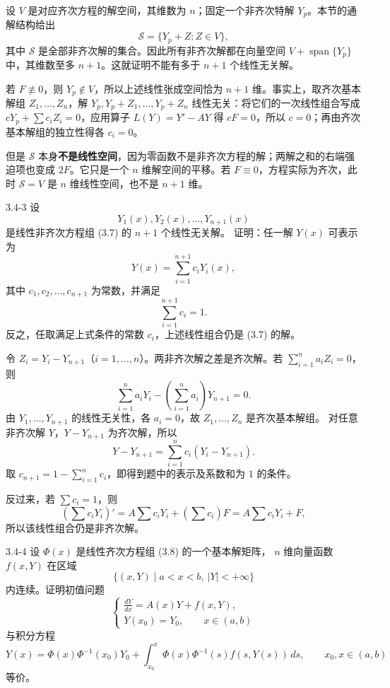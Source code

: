 \documentclass[UTF8,a4paper,11pt]{ctexart}
\begin{document}
\begin{solution}
设 $V$ 是对应齐次方程的解空间，其维数为 $n$；固定一个非齐次特解 $Y_p$。本节的通解结构给出
\[
\mathcal S=\{Y_p+Z:Z\in V\},
\]
其中 $\mathcal S$ 是全部非齐次解的集合。因此所有非齐次解都在向量空间 $V+\operatorname{span}\{Y_p\}$ 中，其维数至多 $n+1$。这就证明不能有多于 $n+1$ 个线性无关解。

若 $F\not\equiv0$，则 $Y_p\notin V$，所以上述线性张成空间恰为 $n+1$ 维。事实上，取齐次基本解组 $Z_1,\ldots,Z_n$，解
$Y_p,Y_p+Z_1,\ldots,Y_p+Z_n$ 线性无关：将它们的一次线性组合写成 $cY_p+\sum c_iZ_i=0$，应用算子 $L(Y)=Y'-AY$ 得 $cF=0$，所以 $c=0$；再由齐次基本解组的独立性得各 $c_i=0$。

但是 $\mathcal S$ 本身\textbf{不是线性空间}，因为零函数不是非齐次方程的解；两解之和的右端强迫项也变成 $2F$。它只是一个 $n$ 维解空间的平移。若 $F\equiv0$，方程实际为齐次，此时 $\mathcal S=V$ 是 $n$ 维线性空间，也不是 $n+1$ 维。
\end{solution}

\begin{problem}{3.4-3}
设
  \[
    Y_1(x),Y_2(x),\ldots,Y_{n+1}(x)
  \]
  是线性非齐次方程组 (3.7) 的 $n+1$ 个线性无关解。
  证明：任一解 $Y(x)$ 可表示为
  \[
    Y(x)=\sum_{i=1}^{n+1}c_iY_i(x),
  \]
  其中 $c_1,c_2,\ldots,c_{n+1}$ 为常数，并满足
  \[
    \sum_{i=1}^{n+1}c_i=1.
  \]
  反之，任取满足上式条件的常数 $c_i$，上述线性组合仍是 (3.7) 的解。
\end{problem}

\begin{solution}
令 $Z_i=Y_i-Y_{n+1}$（$i=1,\ldots,n$）。两非齐次解之差是齐次解。若
$\sum_{i=1}^na_iZ_i=0$，则
\[
\sum_{i=1}^na_iY_i-\left(\sum_{i=1}^na_i\right)Y_{n+1}=0.
\]
由 $Y_1,\ldots,Y_{n+1}$ 的线性无关性，各 $a_i=0$，故 $Z_1,\ldots,Z_n$ 是齐次基本解组。
对任意非齐次解 $Y$，$Y-Y_{n+1}$ 为齐次解，所以
\[
Y-Y_{n+1}=\sum_{i=1}^nc_i(Y_i-Y_{n+1}).
\]
取 $c_{n+1}=1-\sum_{i=1}^nc_i$，即得到题中的表示及系数和为 $1$ 的条件。

反过来，若 $\sum c_i=1$，则
\[
\left(\sum c_iY_i\right)'
=A\sum c_iY_i+\left(\sum c_i\right)F
=A\sum c_iY_i+F,
\]
所以该线性组合仍是非齐次解。
\end{solution}

\begin{problem}{3.4-4}
设 $\Phi(x)$ 是线性齐次方程组 (3.8) 的一个基本解矩阵，
  $n$ 维向量函数 $f(x,Y)$ 在区域
  \[
    \{(x,Y)\mid a<x<b,\ |Y|<+\infty\}
  \]
  内连续。证明初值问题
  \[
  \begin{cases}
    \displaystyle \frac{dY}{dx}=A(x)Y+f(x,Y),\\[5pt]
    Y(x_0)=Y_0,\qquad x\in(a,b)
  \end{cases}
  \]
  与积分方程
  \[
    Y(x)=\Phi(x)\Phi^{-1}(x_0)Y_0
    +\int_{x_0}^{x}
    \Phi(x)\Phi^{-1}(s)f(s,Y(s))\,ds,
    \qquad x_0,x\in(a,b)
  \]
  等价。
\end{problem}
\end{document}
